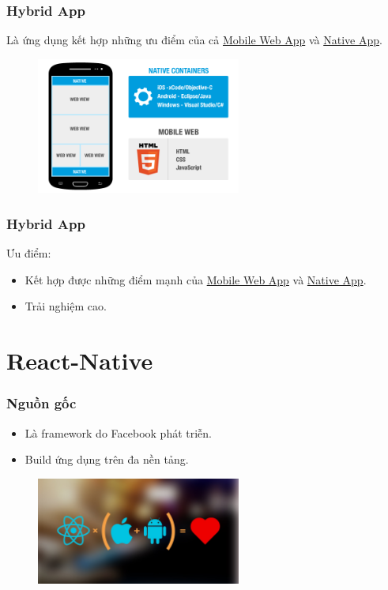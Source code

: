 \documentclass{beamer}
\begin{document}
\begin{frame}
\frametitle{Hybrid App}

Là ứng dụng kết hợp những ưu điểm của cả \hyperlink{MOBILE_WEB_APP}{Mobile Web App} và \hyperlink{NATIVE_APP}{Native App}.

\begin{figure}[h]
	\vspace{5pt}
	\centering
	\includegraphics[width=0.6\textwidth]{Hybrid-App}
\end{figure}
\end{frame}


\begin{frame}
\frametitle{Hybrid App}

Ưu điểm:
\begin{itemize}
    \item<1-> Kết hợp được những điểm mạnh của \hyperlink{MOBILE_WEB_APP}{Mobile Web App} và \hyperlink{NATIVE_APP}{Native App}.
    \item<2-> Trải nghiệm cao.
\end{itemize}

\end{frame}


\section{React-Native}

\begin{frame}
\frametitle{Nguồn gốc}

\begin{itemize}
    \item<1-> Là framework do Facebook phát triễn.
    \item<2-> Build ứng dụng trên đa nền tảng.
\end{itemize}

\begin{figure}[h]
	\vspace{5pt}
	\centering
	\includegraphics[width=0.6\textwidth]{react-native-2}
\end{figure}

\end{frame}
\end{document}
